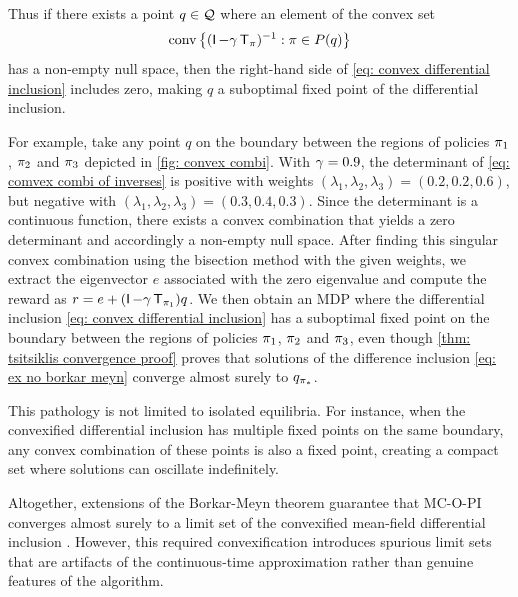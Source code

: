 Thus if there exists a point $q \in \mathcal{Q}$ where an element of the convex set 
\begin{align}
\label{eq: comvex combi of inverses}
    \operatorname*{\textup{conv}} \big\{ ( \operatorname{\mathsf{I}}-\gamma \operatorname{\mathsf{T}}_\pi)^{-1} : \pi \in P(q) \big\}
\end{align}
has a non-empty null space,
then the right-hand side of \eqref{eq: convex differential inclusion} includes zero, 
making $q$ a suboptimal fixed point of the differential inclusion.



For example, 
take any point $q$ on the boundary between the regions of policies $\pi_1$, $\pi_2$ and $\pi_3$ depicted in \autoref{fig: convex combi}.
With $\gamma = 0.9$, the determinant of \eqref{eq: comvex combi of inverses} is positive with weights $(\lambda_1, \lambda_2, \lambda_3) = (0.2, 0.2, 0.6)$, 
but negative with $(\lambda_1, \lambda_2, \lambda_3) = (0.3, 0.4, 0.3)$.
Since the determinant is a continuous function,
there exists a convex combination that yields a zero determinant and accordingly a non-empty null space.
After finding this singular convex combination using the bisection method with the given weights, we extract the eigenvector $e$ associated with the zero eigenvalue and compute the reward as
$r = e + (\operatorname{\mathsf{I}} - \gamma \operatorname{\mathsf{T}}_{\pi_1}) q$.
We then obtain an MDP where the differential inclusion \eqref{eq: convex differential inclusion} has a suboptimal fixed point on the boundary between the regions of policies $\pi_1$, $\pi_2$ and $\pi_3$,
even though \autoref{thm: tsitsiklis convergence proof} proves that solutions of the difference inclusion \eqref{eq: ex no borkar meyn} converge almost surely to $q_{{\pi}_*}$.

This pathology is not limited to isolated equilibria. For instance, when the convexified differential inclusion has multiple fixed points on the same boundary,
any convex combination of these points is also a fixed point, creating a compact set where solutions can oscillate indefinitely.


Altogether, extensions of the Borkar-Meyn theorem guarantee that MC-O-PI converges almost surely to a limit set of the convexified mean-field differential inclusion \citep[Proposition~1.3, Theorem~3.6]{Benaim2005StochasticInclusions}.
However, this required convexification introduces spurious limit sets that are artifacts of the continuous-time approximation rather than genuine features of the algorithm.


